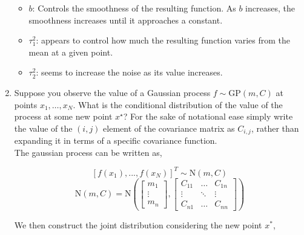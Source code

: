\documentclass[10pt]{article}
\begin{document}
\begin{enumerate}[label=(\Alph*)]
        \begin{itemize}
            \item $b$: Controls the smoothness of the resulting function. As $b$ increases, the smoothness increases until it approaches a constant.

            \item $\tau_1^2$: appears to control how much the resulting function varies from the mean at a given point.

            \item $\tau_2^2$: seems to increase the noise as its value increases.
        \end{itemize}

        \clearpage
        \item Suppose you observe the value of a Gaussian process $f \sim \mbox{GP}(m,C)$ at points $x_1, \ldots, x_N$.  What is the conditional distribution of the value of the process at some new point $x^{\star}$?  For the sake of notational ease simply write the value of the $(i,j)$ element of the covariance matrix as $C_{i,j}$, rather than expanding it in terms of a specific covariance function.\\

        The gaussian process can be written as,

        $$[f(x_1), ... , f(x_N)]^T \sim \text{N}(m, C)$$
        $$\text{N}(m, C) = \text{N} \left( \begin{bmatrix}m_1 \\ \vdots \\ m_n\end{bmatrix}, \begin{bmatrix}C_{11} & \dots & C_{1n} \\ \vdots & \ddots & \vdots \\ C_{n1} & \dots & C_{nn}\end{bmatrix}\right)$$

        We then construct the joint distribution considering the new point $x^*$,


\end{enumerate}
\end{document}
